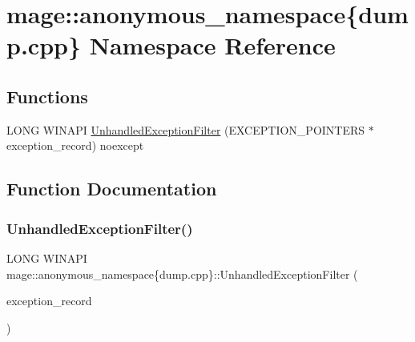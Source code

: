 \hypertarget{namespacemage_1_1anonymous__namespace_02dump_8cpp_03}{}\section{mage\+:\+:anonymous\+\_\+namespace\{dump.\+cpp\} Namespace Reference}
\label{namespacemage_1_1anonymous__namespace_02dump_8cpp_03}
\subsection*{Functions}
\begin{DoxyCompactItemize}
\item 
L\+O\+NG W\+I\+N\+A\+PI \mbox{\hyperlink{namespacemage_1_1anonymous__namespace_02dump_8cpp_03_af36bcb7894c838fe2bae6ef944e30c47}{Unhandled\+Exception\+Filter}} (E\+X\+C\+E\+P\+T\+I\+O\+N\+\_\+\+P\+O\+I\+N\+T\+E\+RS $\ast$exception\+\_\+record) noexcept
\end{DoxyCompactItemize}


\subsection{Function Documentation}
\mbox{\label{namespacemage_1_1anonymous__namespace_02dump_8cpp_03_af36bcb7894c838fe2bae6ef944e30c47}} 
\subsubsection{\texorpdfstring{Unhandled\+Exception\+Filter()}{UnhandledExceptionFilter()}}
{\footnotesize\ttfamily L\+O\+NG W\+I\+N\+A\+PI mage\+::anonymous\+\_\+namespace\{dump.\+cpp\}\+::Unhandled\+Exception\+Filter (\begin{DoxyParamCaption}\item[{E\+X\+C\+E\+P\+T\+I\+O\+N\+\_\+\+P\+O\+I\+N\+T\+E\+RS $\ast$}]{exception\+\_\+record }\end{DoxyParamCaption})\hspace{0.3cm}{\ttfamily [noexcept]}}

